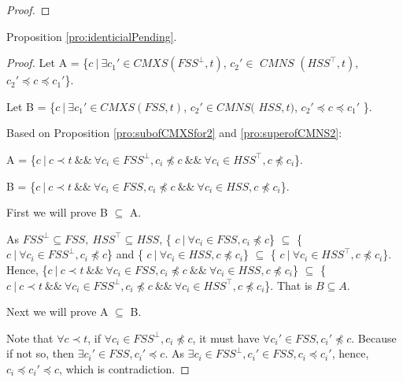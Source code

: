 {\begin{proof}
\end{proof}


Proposition \ref{pro:identicialPending}.
%

\begin{proof}
Let A = \{$ c\ |\ \exists c_{1}' \in CMXS(FSS^{\bot}, t)$, $c_{2}' \in $ $CMNS$ $(HSS^{\top}, t)$, $c_{2}' \preceq c \preceq c_{1}'$\}.


Let B =  \{$ c\ |\ \exists c_{1}' \in CMXS(FSS, t)$, $c_{2}' \in CMNS($ $HSS, t)$, $c_{2}' \preceq c \preceq c_{1}'$ \}.


Based on Proposition \ref{pro:subofCMXSfor2} and \ref{pro:superofCMNS2}:

A = \{$c\ |\ c \prec t\ \&\&\ \forall c_{i} \in FSS^{\bot}, c _{i} \npreceq c \ \&\&\  \forall c_{i} \in HSS^{\top}, c \npreceq c_{i}  $\}.

B = \{$c\ |\ c \prec t\ \&\&\ \forall c_{i} \in FSS, c _{i} \npreceq c \ \&\&\  \forall c_{i} \in HSS, c \npreceq c_{i}  $\}.


First we will prove B $\subseteq$ A.

As $FSS^{\bot} \subseteq FSS,\ HSS^{\top} \subseteq HSS$, \{ $c\ |\ \forall c_{i} \in FSS, c_{i} \npreceq c $\}  $\subseteq$  \{ $c\ |\ \forall c_{i} \in FSS^{\bot}, c_{i} \npreceq c $\} and \{ $c\ |\ \forall c_{i} \in HSS, c \npreceq c_{i} $\}  $\subseteq$  \{ $c\ |\ \forall c_{i} \in HSS^{\top}, c \npreceq c_{i} $\}. Hence, \{$c\ |\ c \prec t\ \&\&\ \forall c_{i} \in FSS, c _{i} \npreceq c \ \&\&\  \forall c_{i} \in HSS, c \npreceq c_{i}  $\}  $\subseteq$ \{$c\ |\ c \prec t\ \&\&\ \forall c_{i} \in FSS^{\bot}, c _{i} \npreceq c \ \&\&\  \forall c_{i} \in HSS^{\top}, c \npreceq c_{i}  $\}. That is  $B \subseteq A$.

Next we will prove A $\subseteq$ B.

Note that  $\forall c \prec t$, if $\forall c_{i} \in FSS^{\bot}, c_{i} \npreceq c$, it must have $\forall c_{i}' \in FSS, c_{i}' \npreceq c$. Because if not so, then $\exists c_{i}' \in FSS, c_{i}' \preceq c$. As $\exists c_{i} \in FSS^{\bot}, c_{i}' \in FSS, c_{i} \preceq c_{i}'$, hence, $c_{i} \preceq c_{i}' \preceq c$,  which is contradiction.


\end{proof}}
